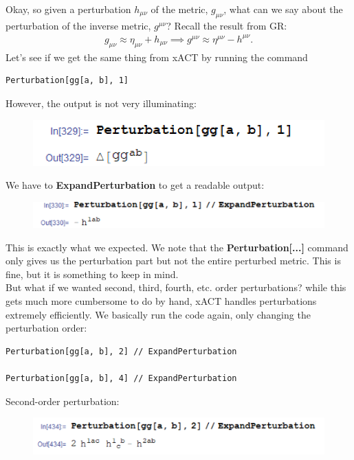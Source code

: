\documentclass{book}
\theoremstyle{definition}
\begin{document}
Okay, so given a perturbation $h_{\mu\nu}$ of the metric, $g_{\mu\nu}$, what can we say about the perturbation of the inverse metric, $g^{\mu\nu}$? Recall the result from GR:
\begin{align}
g_{\mu\nu} \approx \eta_{\mu\nu} + h_{\mu\nu} \implies g^{\mu\nu} \approx \eta^{\mu\nu} - h^{\mu\nu}.
\end{align}
Let's see if we get the same thing from xACT by running the command
\begin{lstlisting}
Perturbation[gg[a, b], 1]
\end{lstlisting}
However, the output is not very illuminating:
\begin{figure}[!htb]
	\includegraphics[scale=0.25]{inv-pert}
\end{figure}

We have to \textbf{ExpandPerturbation} to get a readable output:
\begin{figure}[!htb]
	\includegraphics[scale=0.25]{inv-pert-exp}
\end{figure}


This is exactly what we expected. We note that the \textbf{Perturbation[...]} command only gives us the perturbation part but not the entire perturbed metric. This is fine, but it is something to keep in mind. \\


But what if we wanted second, third, fourth, etc. order perturbations? while this gets much more cumbersome to do by hand, xACT handles perturbations extremely efficiently. We basically run the code again, only changing the perturbation order:
\begin{lstlisting}
Perturbation[gg[a, b], 2] // ExpandPerturbation

Perturbation[gg[a, b], 4] // ExpandPerturbation
\end{lstlisting}

Second-order perturbation:
\begin{figure}[!htb]
	\includegraphics[scale=0.25]{second-pert}
\end{figure}
\end{document}
